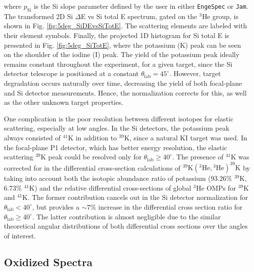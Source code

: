 \noindent
where $p_{\mathrm{Si}}$ is the Si slope parameter defined by the user in either \texttt{EngeSpec} or \texttt{Jam}. The transformed 2D Si $\Delta$E vs Si total E spectrum, gated on the $^{3}$He group, is shown in Fig. \ref{fig:5deg_SiDEvsSiTotE}. The scattering elements are labeled with their element symbols. Finally, the projected 1D histogram for Si total E is presented in Fig. \ref{fig:5deg_SiTotE}, where the potassium (K) peak can be seen on the shoulder of the iodine (I) peak. The yield of the potassium peak ideally remains constant throughout the experiment, for a given target, since the Si detector telescope is positioned at a constant $\theta_{\mathrm{lab}} = 45^{\circ}$. However, target degradation occurs naturally over time, decreasing the yield of both focal-plane and Si detector measurements. Hence, the normalization corrects for this, as well as the other unknown target properties. 

One complication is the poor resolution between different isotopes for elastic scattering, especially at low angles. In the Si detectors, the potassium peak always consisted of $^{41}$K in addition to $^{39}$K, since a natural KI target was used. In the focal-plane P1 detector, which has better energy resolution, the elastic scattering $^{39}$K peak could be resolved only for $\theta_{\mathrm{lab}} \geq 40^{\circ}$. The presence of $^{41}$K was corrected for in the differential cross-section calculations of $^{39}\mathrm{K}(^{3}\mathrm{He}, {}^{3}\mathrm{He})^{39}\mathrm{K}$ by taking into account both the isotopic abundance ratio of potassium ($93.26\%$ $^{39}$K, $6.73\%$ $^{41}$K) and the relative differential cross-sections of global $^{3}$He OMPs for $^{39}$K and $^{41}$K. The former contribution cancels out in the Si detector normalization for $\theta_{\mathrm{lab}} < 40^{\circ}$, but provides a $\sim 7\%$ increase in the differential cross section ratio for $\theta_{\mathrm{lab}} \geq 40^{\circ}$. The latter contribution is almost negligible due to the similar theoretical angular distributions of both differential cross sections over the angles of interest.


\subsection{Oxidized Spectra} \label{subsec:oxidized_spectra}


